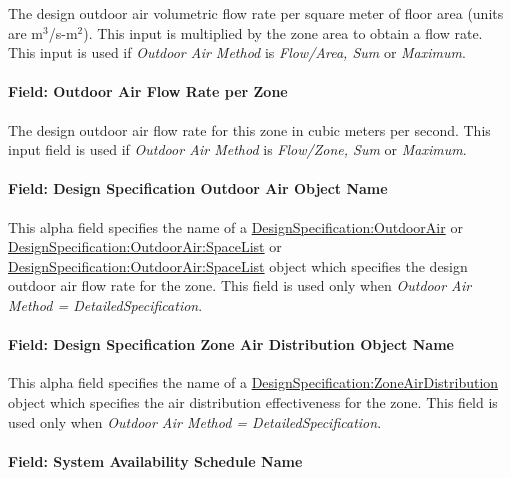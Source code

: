 The design outdoor air volumetric flow rate per square meter of floor area (units are m\(^{3}\)/s-m\(^{2}\)). This input is multiplied by the zone area to obtain a flow rate. This input is used if \emph{Outdoor Air Method} is \emph{Flow/Area, Sum} or \emph{Maximum}.

\paragraph{Field: Outdoor Air Flow Rate per Zone}\label{field-outdoor-air-flow-rate-per-zone-6}

The design outdoor air flow rate for this zone in cubic meters per second. This input field is used if \emph{Outdoor Air Method} is \emph{Flow/Zone, Sum} or \emph{Maximum}.

\paragraph{Field: Design Specification Outdoor Air Object Name}\label{field-design-specification-outdoor-air-object-name-6}

This alpha field specifies the name of a \hyperref[designspecificationoutdoorair]{DesignSpecification:OutdoorAir} or \hyperref[designspecificationoutdoorairspacelist]{DesignSpecification:OutdoorAir:SpaceList} or \hyperref[designspecificationoutdoorairspacelist]{DesignSpecification:OutdoorAir:SpaceList} object which specifies the design outdoor air flow rate for the zone. This field is used only when \emph{Outdoor Air Method = DetailedSpecification}.

\paragraph{Field: Design Specification Zone Air Distribution Object Name}\label{field-design-specification-zone-air-distribution-object-name-5}

This alpha field specifies the name of a \hyperref[designspecificationzoneairdistribution]{DesignSpecification:ZoneAirDistribution} object which specifies the air distribution effectiveness for the zone. This field is used only when \emph{Outdoor Air Method = DetailedSpecification}.

\paragraph{Field: System Availability Schedule Name}\label{field-system-availability-schedule-name-5}

